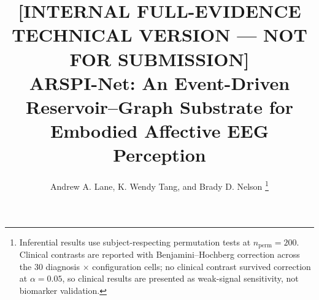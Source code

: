 \documentclass[journal]{IEEEtran}
\begin{document}
\title{[INTERNAL FULL-EVIDENCE TECHNICAL VERSION --- NOT FOR SUBMISSION]\\ ARSPI-Net: An Event-Driven Reservoir--Graph Substrate for Embodied Affective EEG Perception}

\author{Andrew A. Lane, K. Wendy Tang, and Brady D. Nelson%
\thanks{Inferential results use subject-respecting permutation tests at $n_{\mathrm{perm}}=200$. Clinical contrasts are reported with Benjamini--Hochberg correction across the 30 diagnosis $\times$ configuration cells; no clinical contrast survived correction at $\alpha=0.05$, so clinical results are presented as weak-signal sensitivity, not biomarker validation.}%
}

\maketitle
\end{document}
